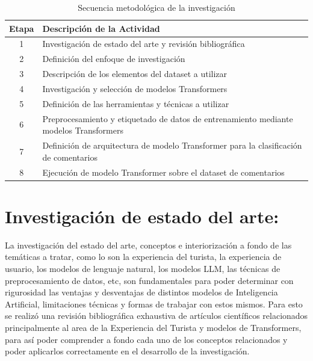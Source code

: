 \begin{table}[htbp]
    \centering
    \caption{Secuencia metodológica de la investigación}
    \label{tab:metodologia}
    \begin{tabularx}{\textwidth}{@{} c X @{}}
        \toprule
        \textbf{Etapa} & \textbf{Descripción de la Actividad} \\
        \midrule

        1 & Investigación de estado del arte y revisión bibliográfica \\

        2 & Definición del enfoque de investigación \\

        3 & Descripción de los elementos del dataset a utilizar \\
        
        4 & Investigación y selección de modelos Transformers \\
        
        5 & Definición de las herramientas y técnicas a utilizar \\
        
        6 & Preprocesamiento y etiquetado de datos de entrenamiento mediante modelos Transformers \\
        
        7 & Definición de arquitectura de modelo Transformer para la clasificación de comentarios \\

        8 & Ejecución de modelo Transformer sobre el dataset de comentarios \\
        
        
        \bottomrule
    \end{tabularx}
\end{table}

\section{\textbf{Investigación de estado del arte:}}

La investigación del estado del arte, conceptos e interiorización a fondo de las temáticas a tratar, como lo son la experiencia del turista, la experiencia de usuario, los modelos de lenguaje natural, los modelos LLM, las técnicas de preprocesamiento de datos, etc, son fundamentales para poder determinar con rigurosidad las ventajas y desventajas de distintos modelos de Inteligencia Artificial, limitaciones técnicas y formas de trabajar con estos mismos. Para esto se realizó una revisión bibliográfica exhaustiva de artículos científicos relacionados principalmente al area de la Experiencia del Turista y modelos de Transformers, para así poder comprender a fondo cada uno de los conceptos relacionados y poder aplicarlos correctamente en el desarrollo de la investigación. 

